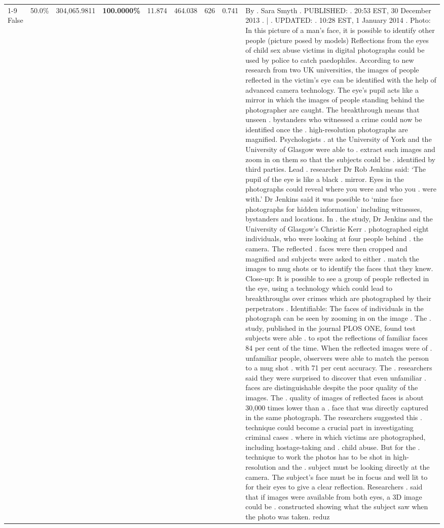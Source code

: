 \begin{table}[H]
\begin{tabular}{lllrlllll}
\cline{1-9}
False & 50.0\% & 304,065.9811 & \bfseries \color{red} 100.0000\% & 11.874 & 464.038 & 626 & 0.741 & By . Sara Smyth . PUBLISHED: . 20:53 EST, 30 December 2013 . | . UPDATED: . 10:28 EST, 1 January 2014 . Photo: In this picture of a man's face, it is possible to identify other people (picture posed by models) Reflections from the eyes of child sex abuse victims in digital photographs could be used by police to catch paedophiles. According to new research from two UK universities, the images of people reflected in the victim's eye can be identified with the help of advanced camera technology. The eye's pupil acts like a mirror in which the images of people standing behind the photographer are caught. The breakthrough means that unseen . bystanders who witnessed a crime could now be identified once the . high-resolution photographs are magnified. Psychologists . at the University of York and the University of Glasgow were able to . extract such images and zoom in on them so that the subjects could be . identified by third parties. Lead . researcher Dr Rob Jenkins said: ‘The pupil of the eye is like a black . mirror. Eyes in the photographs could reveal where you were and who you . were with.' Dr Jenkins said it was possible to ‘mine face photographs for hidden information' including witnesses, bystanders and locations. In . the study, Dr Jenkins and the University of Glasgow's Christie Kerr . photographed eight individuals, who were looking at four people behind . the camera. The reflected . faces were then cropped and magnified and subjects were asked to either . match the images to mug shots or to identify the faces that they knew. Close-up: It is possible to see a group of people reflected in the eye, using a technology which could lead to breakthroughs over crimes which are photographed by their perpetrators . Identifiable: The faces of individuals in the photograph can be seen by zooming in on the image . The . study, published in the journal PLOS ONE, found test subjects were able . to spot the reflections of familiar faces 84 per cent of the time. When the reflected images were of . unfamiliar people, observers were able to match the person to a mug shot . with 71 per cent accuracy. The . researchers said they were surprised to discover that even unfamiliar . faces are distinguishable despite the poor quality of the images. The . quality of images of reflected faces is about 30,000 times lower than a . face that was directly captured in the same photograph. The researchers suggested this . technique could become a crucial part in investigating criminal cases . where in which victims are photographed, including hostage-taking and . child abuse. But for the . technique to work the photos has to be shot in high-resolution and the . subject must be looking directly at the camera. The subject's face must be in focus and well lit to for their eyes to give a clear reflection. Researchers . said that if images were available from both eyes, a 3D image could be . constructed showing what the subject saw when the photo was taken. reduz \\

\end{tabular}
\end{table}
